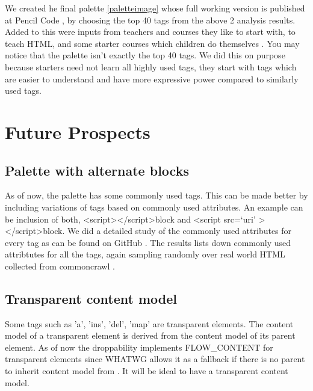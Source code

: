 \documentclass[conference]{IEEEtran}
\begin{document}
We created he final palette \ref{paletteimage} whose full working version is published at Pencil Code \cite{pencilcodehtml}, by choosing the top 40 tags from the above 2 analysis results. Added to this were inputs from teachers and courses they like to start with, to teach HTML, and some starter courses which children do themselves \cite{htmltutor1} \cite{htmltutor2} \cite{htmltutor3}. You may notice that the palette isn't exactly the top 40 tags. We did this on purpose because starters need not learn all highly used tags, they start with tags which are easier to understand and have more expressive power compared to similarly used tags.

\section{Future Prospects}

\subsection{Palette with alternate blocks}
As of now, the palette has some commonly used tags. This can be made better by including variations of tags based on commonly used attributes. An example can be inclusion of both, \textless script\textgreater \textless /script\textgreater block and \textless script src=`uri' \textgreater \textless/script\textgreater block. We did a detailed study of the commonly used attributes for every tag as can be found on GitHub \cite{FullResults}. The results lists down commonly used attribtutes for all the tags, again sampling randomly over real world HTML collected from commoncrawl \cite{commoncrawl}.

\subsection{Transparent content model}
Some tags such as 'a', 'ins', 'del', 'map' are transparent elements. The content model of a transparent element is derived from the content model of its parent element. As of now the droppability implements FLOW\_CONTENT \cite{flowcontent} for transparent elements since WHATWG allows it as a fallback if there is no parent to inherit content model from \cite{whatwgtransparent}. It will be ideal to have a transparent content model.
\end{document}
